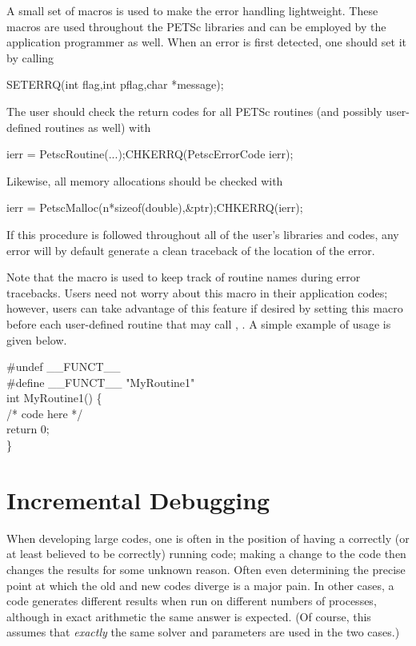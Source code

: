 {{{A small set of macros is used to make the error handling lightweight.
These macros are used throughout the PETSc libraries and can be employed
by the application   
programmer as well.  When an error is first detected, 
one should set it by calling
\begin{tabbing}
   SETERRQ(int flag,int pflag,char *message);
\end{tabbing}
The user should check the return codes for all PETSc routines (and
possibly user-defined routines as well) with 
\begin{tabbing}
  ierr = PetscRoutine(...);CHKERRQ(PetscErrorCode ierr);
\end{tabbing}
Likewise, all memory allocations should be checked with 
\begin{tabbing}
  ierr = PetscMalloc(n*sizeof(double),\&ptr);CHKERRQ(ierr);
\end{tabbing}
If this procedure is followed throughout all of the user's libraries 
and codes, any error will by default generate a clean traceback of 
the location  
of the error. 

Note that the macro  is used to keep track of
routine names during error tracebacks.  Users need not worry about this
macro in their application codes; however, users can take advantage of this feature
if desired by setting this macro before each user-defined routine
that may call , .
A simple example of usage is given below.
\begin{tabbing}
    \#undef \_\_FUNCT\_\_  \\
    \#define \_\_FUNCT\_\_ "MyRoutine1"\\
    int MyRoutine1() \{ \\
        /* code here */\\
        return 0;\\
    \}
\end{tabbing}

\section{Incremental Debugging} 

When developing large codes, one is often in the position of having a
correctly (or at least believed to be correctly) running code; making
a change to the code then changes the results for some unknown reason.
Often even determining the precise point at which the old and new
codes diverge is a major pain.  In other cases, a code generates
different results when run on different numbers of processes,
although in exact arithmetic the same answer is expected. (Of course,
this assumes that {\em exactly} the same solver and parameters are
used in the two cases.)
 
}}}
